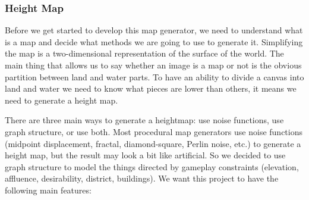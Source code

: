 \subsubsection{Height Map}
\label{sec:Design>Map Generator Design>Height Map}
Before we get started to develop this map generator, we need to understand what is a map and decide what methods we are going to use to generate it. Simplifying the map is a two-dimensional representation of the surface of the world. The main thing that allows us to say whether an image is a map or not is the obvious partition between land and water parts. To have an ability to divide a canvas into land and water we need to know what pieces are lower than others, it means we need to generate a height map.

There are three main ways to generate a heightmap: use noise functions, use graph structure, or use both. Most procedural map generators use noise functions (midpoint displacement, fractal, diamond-square, Perlin noise, etc.) to generate a height map, but the result may look a bit like artificial. So we decided to use graph structure to model the things directed by gameplay constraints (elevation, affluence, desirability, district, buildings). We want this project to have the following main features:

